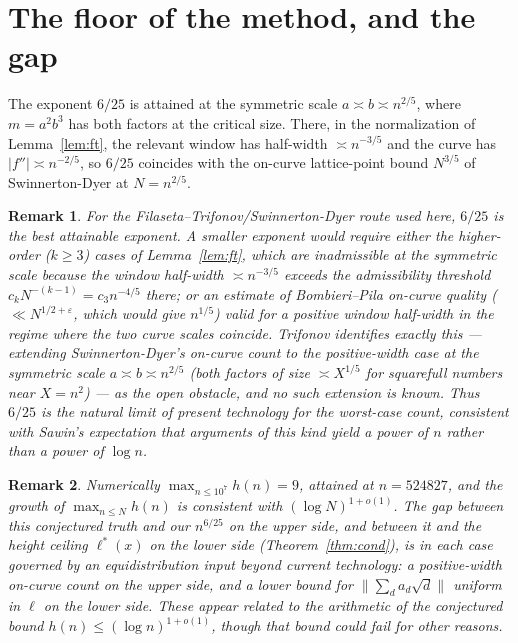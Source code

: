 \documentclass[11pt]{article}
\newtheorem{remark}{Remark}
\theoremstyle{definition}
\newcommand{\norm}[1]{\lVert #1 \rVert}
\begin{document}
\section{The floor of the method, and the gap}\label{sec:floor}
The exponent $6/25$ is attained at the symmetric scale $a\asymp b\asymp n^{2/5}$, where $m=a^2b^3$ has both
factors at the critical size. There, in the normalization of Lemma~\ref{lem:ft}, the relevant window has
half-width $\asymp n^{-3/5}$ and the curve has $|f''|\asymp n^{-2/5}$, so $6/25$ coincides with the
on-curve lattice-point bound $N^{3/5}$ of Swinnerton-Dyer \cite{SD} at $N=n^{2/5}$.

\begin{remark}\label{rem:floor}
For the Filaseta--Trifonov/Swinnerton-Dyer route used here, $6/25$ is the best attainable exponent. A smaller
exponent would require either the higher-order ($k\ge3$) cases of Lemma~\ref{lem:ft}, which are inadmissible
at the symmetric scale because the window half-width $\asymp n^{-3/5}$ exceeds the admissibility threshold
$c_kN^{-(k-1)}=c_3n^{-4/5}$ there; or an estimate of Bombieri--Pila on-curve quality
($\ll N^{1/2+\varepsilon}$, which would give $n^{1/5}$) valid for a positive window half-width in the regime
where the two curve scales coincide. Trifonov \cite{Tri98,Tri02} identifies exactly this --- extending
Swinnerton-Dyer's on-curve count to the positive-width case at the symmetric scale $a\asymp b\asymp n^{2/5}$
(both factors of size $\asymp X^{1/5}$ for squarefull numbers near $X=n^2$) --- as the open obstacle, and no
such extension is known. Thus $6/25$ is the natural limit of present technology for the worst-case count,
consistent with Sawin's expectation \cite{Erdos942} that arguments of this kind yield a power of $n$ rather
than a power of $\log n$.
\end{remark}

\begin{remark}
Numerically $\max_{n\le10^7}h(n)=9$, attained at $n=524827$, and the growth of $\max_{n\le N}h(n)$ is
consistent with $(\log N)^{1+o(1)}$. The gap between this conjectured truth and our $n^{6/25}$ on the upper
side, and between it and the height ceiling $\ell^\ast(x)$ on the lower side (Theorem~\ref{thm:cond}), is in
each case governed by an equidistribution input beyond current technology: a positive-width on-curve count on
the upper side, and a lower bound for $\norm{\sum_d a_d\sqrt d}$ uniform in $\ell$ on the lower side. These
appear related to the arithmetic of the conjectured bound $h(n)\le(\log n)^{1+o(1)}$, though that bound could
fail for other reasons.
\end{remark}
\end{document}
